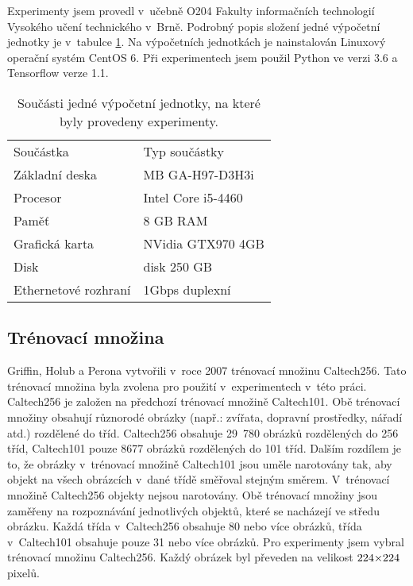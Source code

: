 Experimenty jsem provedl v~učebně O204 Fakulty informačních technologií Vysokého učení technického v~Brně.
Podrobný popis složení jedné výpočetní jednotky je v~tabulce \ref{table:o204pc}.
Na výpočetních jednotkách je nainstalován Linuxový operační systém CentOS 6.
Při experimentech jsem použil Python ve verzi 3.6 a Tensorflow verze 1.1.

\begin{table}
\centering
\begin{tabular}{l|l}
    Součástka & Typ součástky\\
    \hhline{=|=}
    Základní deska & MB GA-H97-D3H3i\\
    Procesor & Intel Core i5-4460\\
    Paměť & 8 GB RAM\\
    Grafická karta & NVidia GTX970 4GB\\
    Disk & disk 250 GB\\
    Ethernetové rozhraní & 1Gbps duplexní\\
\end{tabular}
\caption{Součásti jedné výpočetní jednotky, na které byly provedeny experimenty.}
\label{table:o204pc}
\end{table}

\subsection{Trénovací množina}
\label{sub:dataset}

Griffin, Holub a Perona \cite{Griffin2007} vytvořili v~roce 2007 trénovací množinu Caltech256.
Tato trénovací množina byla zvolena pro použití v~experimentech v~této práci.
Caltech256 je založen na předchozí trénovací množině Caltech101.
Obě trénovací množiny obsahují různorodé obrázky (např.: zvířata, dopravní prostředky, nářadí atd.) rozdělené do tříd.
Caltech256 obsahuje 29~780 obrázků rozdělených do 256 tříd, Caltech101 pouze 8677 obrázků rozdělených do 101 tříd.
Dalším rozdílem je to, že obrázky v~trénovací množině Caltech101 jsou uměle narotovány tak, aby objekt na všech obrázcích v~dané třídě směřoval stejným směrem.
V~trénovací množině Caltech256 objekty nejsou narotovány.
Obě trénovací množiny jsou zaměřeny na rozpoznávání jednotlivých objektů, které se nacházejí ve středu obrázku.
Každá třída v~Caltech256 obsahuje 80 nebo více obrázků, třída v~Caltech101 obsahuje pouze 31 nebo více obrázků.
Pro experimenty jsem vybral trénovací množinu Caltech256.
Každý obrázek byl převeden na velikost $\sisetup{tight-spacing=true}224{\times}224$ pixelů.

